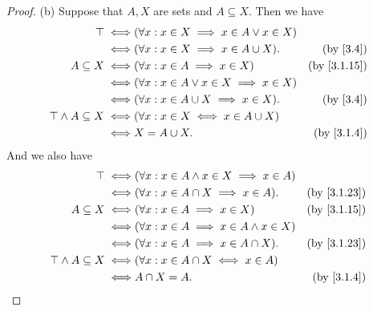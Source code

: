\begin{proof}{(b)}
  Suppose that \(A, X\) are sets and \(A \subseteq X\).
  Then we have
  \begin{align*}
    \top \iff                     & (\forall x : x \in X \implies x \in A \lor x \in X)                             \\
    \iff                          & (\forall x : x \in X \implies x \in A \cup X).      & \text{(by \cref{3.4})}    \\
    A \subseteq X \iff            & (\forall x : x \in A \implies x \in X)              & \text{(by \cref{3.1.15})} \\
    \iff                          & (\forall x : x \in A \lor x \in X \implies x \in X)                             \\
    \iff                          & (\forall x : x \in A \cup X \implies x \in X).      & \text{(by \cref{3.4})}    \\
    \top \land A \subseteq X \iff & (\forall x : x \in X \iff x \in A \cup X)                                       \\
    \iff                          & X = A \cup X.                                       & \text{(by \cref{3.1.4})}
  \end{align*}
  And we also have
  \begin{align*}
    \top \iff                     & (\forall x : x \in A \land x \in X \implies x \in A)                             \\
    \iff                          & (\forall x : x \in A \cap X \implies x \in A).       & \text{(by \cref{3.1.23})} \\
    A \subseteq X \iff            & (\forall x : x \in A \implies x \in X)               & \text{(by \cref{3.1.15})} \\
    \iff                          & (\forall x : x \in A \implies x \in A \land x \in X)                             \\
    \iff                          & (\forall x : x \in A \implies x \in A \cap X).       & \text{(by \cref{3.1.23})} \\
    \top \land A \subseteq X \iff & (\forall x : x \in A \cap X \iff x \in A)                                        \\
    \iff                          & A \cap X = A.                                        & \text{(by \cref{3.1.4})}
  \end{align*}
\end{proof}

